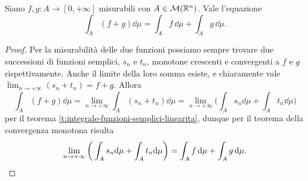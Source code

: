 \begin{proprieta} \label{pr:linearita-integrale-lebesgue}
	Siano $f,g\colon A\to[0,+\infty]$ misurabili con $A\in\mathcal M(\mathbb{R}^n)$.
	Vale l'equazione
	\begin{equation}
		\int_A(f+g)\dd\mu=\int_Af\,\dd\mu+\int_Ag\,\dd\mu.
		\label{eq:linearita-integrale-lebesgue}
	\end{equation}
\end{proprieta}
\begin{proof}
	Per la misurabilità delle due funzioni possiamo sempre trovare due successioni di funzioni semplici, $s_n$ e $t_n$, monotone crescenti e convergenti a $f$ e $g$ rispettivamente.
	Anche il limite della loro somma esiste, e chiaramente vale $\lim_{n\to+\infty}(s_n+t_n)=f+g$.
	Allora
	\begin{equation}
		\int_A(f+g)\dd\mu=\lim_{n\to+\infty}\int_A(s_n+t_n)\dd\mu=\lim_{n\to+\infty}\bigg(\int_As_n\dd\mu+\int_At_n\dd\mu\bigg)
	\end{equation}
	per il teorema \ref{t:integrale-funzioni-semplici-linearita}, dunque per il teorema della convergenza monotona risulta
	\begin{equation}
		\lim_{n\to+\infty}\bigg(\int_As_n\textup{d}\mu+\int_At_n\textup{d}\mu\bigg)=\int_Af\,\textup{d}\mu+\int_Ag\,\textup{d}\mu.\qedhere
	\end{equation}
\end{proof}

